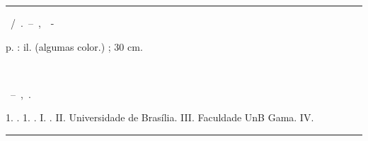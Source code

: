 \begin{fichacatalografica}
	\vspace*{\fill}					%
	\hrule							%
	\begin{center}					%
	\begin{minipage}[c]{12.5cm}		%
	
	\imprimirautor
	
	\hspace{0.5cm} \imprimirtitulo~/~\imprimirautor.~--~\imprimirlocal,~\imprimirdata~-
	
	\hspace{0.5cm} \pageref{LastPage} p. : il. (algumas color.) ; 30 cm.
	
	
	\hspace{0.5cm} \imprimirorientadorRotulo~\imprimirorientador
	
	
	\hspace{0.5cm}\parbox[t]{\textwidth}{\imprimirtipotrabalho~--~\imprimirinstituicao,~\imprimirdata.}
	
	
	\hspace{0.5cm}
		1. \imprimirpalavrachaveum.
		1. \imprimirpalavrachavedois.
		I. \imprimirorientador.
		II. Universidade de Brasília.
		III. Faculdade UnB Gama.
		IV. \imprimirtitulo
	
	
	\end{minipage}
	\vspace{0.6cm}
	\hrule
	\end{center}
\end{fichacatalografica}